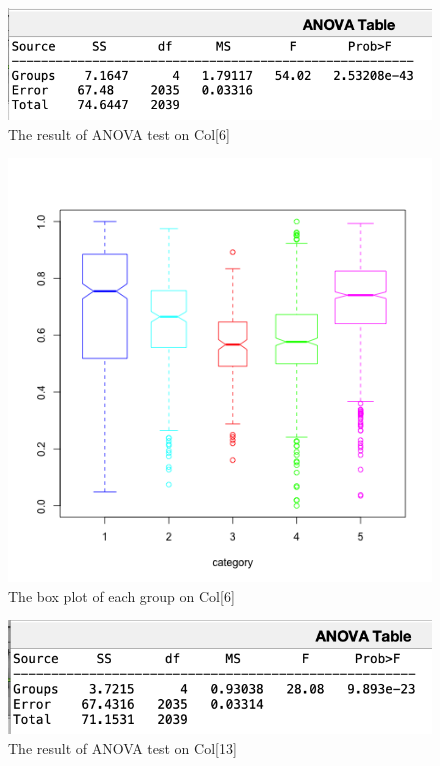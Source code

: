 \documentclass[a4paper]{article}
\begin{document}
\begin{figure}[!h]
	\centering
	\includegraphics[width=\linewidth]{images/5b01.png}
	\caption{\label{5b01}The result of ANOVA test on Col[6]}
\end{figure}
\begin{figure}[!h]
	\centering
	\includegraphics[width=\linewidth]{images/5b1.png}
	\caption{\label{5b1}The box plot of each group on Col[6]}
\end{figure}
\begin{figure}[!h]
	\centering
	\includegraphics[width=\linewidth]{images/5b02.png}
	\caption{\label{5b02}The result of ANOVA test on Col[13]}
\end{figure}
\end{document}

